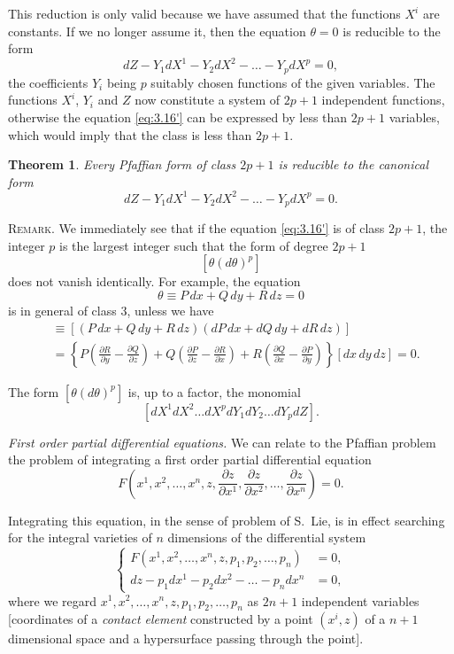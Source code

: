 \documentclass[leqno,11pt]{book}
\numberwithin{equation}{chapter}
\newcommand{\pd}{\partial}
\theoremstyle{shape1}
\newtheorem*{thm*}{\hspace{15pt}Theorem}
\theoremstyle{shape0}
\theoremstyle{shape2}
\theoremstyle{definition}
\begin{document}
This reduction is only valid because we have assumed that the functions $X^{i}$ are constants. If we no longer assume it, then the equation $\theta=0$ is reducible to the form
\[
dZ-Y_{1}dX^{1}-Y_{2}dX^{2}-\dots-Y_{p}dX^{p}=0,
\]
the coefficients $Y_{i}$ being $p$ suitably chosen functions of the given variables. The functions $X^{i}$, $Y_{i}$ and $Z$ now constitute a system of $2p+1$ independent functions, otherwise the equation \eqref{eq:3.16'} can be expressed by  less than $2p+1$ variables, which would imply that the class is less than $2p+1$.

\begin{thm*}
  Every Pfaffian form of class $2p+1$ is reducible to the canonical form
\[
dZ-Y_{1}dX^{1}-Y_{2}dX^{2}-\dots-Y_{p}dX^{p}=0.
\]
\end{thm*}


\vspace{12pt}\fsec  \textsc{Remark.} {We immediately see that if the equation \eqref{eq:3.16'} is of class $2p+1$, the integer $p$ is the largest integer such that the form of degree $2p+1$}
\[
[\theta(d\theta)^{p}]
\]
{does not  vanish identically. For example, the equation}
\[
\theta\equiv P\,dx+Q\,dy+R\,dz=0
\]
{is in  general  of class $3$, unless we have}
\begin{align*}
  [\theta d\theta]&\equiv[(P\,dx+Q\,dy+R\,dz)(dP\,dx+dQ\,dy+dR\,dz)]\\
&=\left\{P\left(\frac{\pd R}{\pd y}-\frac{\pd Q}{\pd z}\right)+Q\left(\frac{\pd P}{\pd z}-\frac{\pd R}{\pd x}\right)+R\left(\frac{\pd Q}{\pd x}-\frac{\pd P}{\pd y}\right)\right\}[dx\,dy\,dz]=0.
\end{align*}

{The form $[\theta(d\theta)^{p}]$ is, up to a  factor,  the monomial}\[
[dX^{1}dX^{2}\dots dX^{p}dY_{1}dY_{2}\dots dY_{p}dZ].
\]


\vspace{12pt}\fsec \emph{First order partial differential equations.} We can relate to the Pfaffian problem the problem of integrating a first order partial differential equation
\begin{equation}
  \label{eq:3.16}
  F\left(x^{1},x^{2},\dots,x^{n},z,\frac{\pd z}{\pd x^{1}},\frac{\pd z}{\pd x^{2}},\dots,\frac{\pd z}{\pd x^{n}}\right)=0.
\end{equation}

Integrating this equation, in the sense of problem of S.~Lie, is in effect  searching for the integral varieties of $n$ dimensions of the differential system
\begin{equation}
  \label{eq:3.17}
  \left\{
    \begin{aligned}
      F(x^{1},x^{2},\dots,x^{n},z,p_{1},p_{2},\dots,p_{n})&=0,\\
      dz-p_{1}dx^{1}-p_{2}dx^{2}-\dots-p_{n}dx^{n}&=0,
    \end{aligned}
  \right.
\end{equation}
where we regard $x^{1},x^{2},\dots,x^{n},z,p_{1},p_{2},\dots,p_{n}$ as $2n+1$ independent variables [coordinates of a \emph{contact element} constructed by a point $(x^{i},z)$ of a $n+1$ dimensional space and a hypersurface passing through the point].
\end{document}
